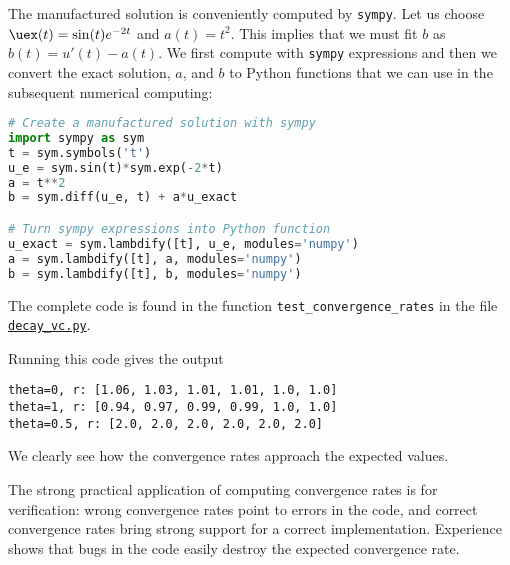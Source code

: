 \documentclass[graybox,sectrefs,envcountresetchap,open=right,final]{svmonodo}
\newenvironment{notice_mdfboxadmon}[1][]{
\begin{notice_mdfboxmdframed}[frametitle=#1]
}
{
\end{notice_mdfboxmdframed}
}
\begin{document}
The manufactured solution is conveniently computed by \texttt{sympy}.
Let us choose $\uex(t) = \sin(t)e^{-2t}$ and $a(t)=t^2$.
This implies that we must fit $b$ as $b(t)=u'(t)-a(t)$.
We first compute with \texttt{sympy} expressions and then we convert
the exact solution, $a$, and $b$ to Python functions that we
can use in the subsequent numerical computing:













\begin{lstlisting}[language=python,style=blue1_bluegreen]
# Create a manufactured solution with sympy
import sympy as sym
t = sym.symbols('t')
u_e = sym.sin(t)*sym.exp(-2*t)
a = t**2
b = sym.diff(u_e, t) + a*u_exact

# Turn sympy expressions into Python function
u_exact = sym.lambdify([t], u_e, modules='numpy')
a = sym.lambdify([t], a, modules='numpy')
b = sym.lambdify([t], b, modules='numpy')

\end{lstlisting}

The complete code is found in the function \Verb!test_convergence_rates!
in the file \href{{http://tinyurl.com/ofkw6kc/genz/decay_vc.py}}{\nolinkurl{decay_vc.py}}.

Running this code gives the output





\begin{Verbatim}[frame=lines,label=\fbox{{\tiny Terminal}},framesep=2.5mm,framerule=0.7pt,fontsize=\fontsize{9pt}{9pt}]
theta=0, r: [1.06, 1.03, 1.01, 1.01, 1.0, 1.0]
theta=1, r: [0.94, 0.97, 0.99, 0.99, 1.0, 1.0]
theta=0.5, r: [2.0, 2.0, 2.0, 2.0, 2.0, 2.0]

\end{Verbatim}

We clearly see how the convergence rates approach the expected values.



\begin{notice_mdfboxadmon}
The strong practical application of computing convergence rates is for
verification: wrong convergence rates point to errors in the code, and
correct convergence rates bring strong support for a correct implementation.
Experience shows that bugs in the code easily destroy the
expected convergence rate.
\end{notice_mdfboxadmon} %
\end{document}
